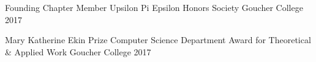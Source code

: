 



\begin{cvhonors}

  \cvhonor
    {Founding Chapter Member} %
    {Upsilon Pi Epsilon Honors Society} %
    {Goucher College} %
    {2017} %

  \cvhonor
    {Mary Katherine Ekin Prize} %
    {Computer Science Department Award for Theoretical \& Applied Work} %
    {Goucher College} %
    {2017} %

\end{cvhonors}


